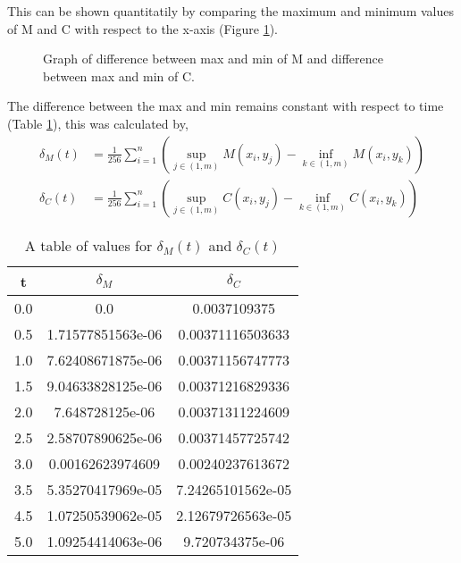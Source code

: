     This can be shown quantitatily by comparing the maximum and minimum values of M and C with respect to the x-axis (Figure \ref{fig:maxMin}). 
  \begin{figure}[h!bt]
    \begin{center}
      \caption{Graph of difference between max and min of M and difference between max and min of C.}
      \label{fig:maxMin}
    \end{center}
  \end{figure}

  The difference between the max and min remains constant with respect to time (Table \ref{tab:overTime}), this was calculated by,
  \begin{equation}
    \begin{aligned}
      \delta_M(t) &= \frac{1}{256}\sum_{i = 1}^n \left( \sup_{j \in (1,m)} M(x_i,y_j) - \inf_{k \in (1,m)} M(x_i,y_k) \right) \\
      \delta_C(t) &= \frac{1}{256}\sum_{i = 1}^n \left( \sup_{j \in (1,m)} C(x_i,y_j) - \inf_{k \in (1,m)} C(x_i,y_k) \right)   
    \end{aligned}
  \end{equation}
  
   \begin{table}
    \begin{center}
      \begin{tabular}{| c | c | c |} 
        \hline
        t & $\delta_M$ & $\delta_C$ \\
        \hline
        0.0 & 0.0 & 0.0037109375 \\
        0.5 &1.71577851563e-06 & 0.00371116503633\\
        1.0 &7.62408671875e-06 & 0.00371156747773\\
        1.5 &9.04633828125e-06 & 0.00371216829336\\
        2.0 &7.648728125e-06 & 0.00371311224609\\
        2.5 &2.58707890625e-06 & 0.00371457725742\\
        3.0 &0.00162623974609 & 0.00240237613672\\
        3.5 &5.35270417969e-05 & 7.24265101562e-05\\
        4.5 &1.07250539062e-05 & 2.12679726563e-05 \\
        5.0 &1.09254414063e-06 & 9.720734375e-06\\
        \hline
      \end{tabular}
      \caption{A table of values for $\delta_M(t)$ and $\delta_C(t)$}
      \label{tab:overTime}
    \end{center}
  \end{table}
   
